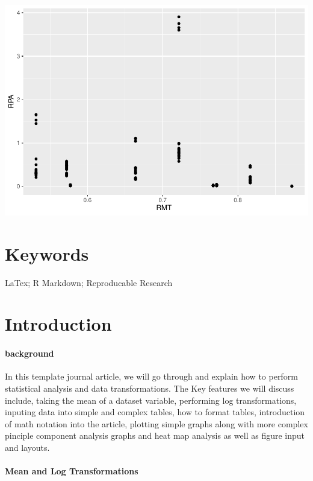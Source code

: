 \documentclass[]{elsarticle} %
\makeatletter
\def\maxwidth{\ifdim\Gin@nat@width>\linewidth\linewidth
\else\Gin@nat@width\fi}
\let\Oldincludegraphics\includegraphics
\renewcommand{\includegraphics}[1]{\Oldincludegraphics[width=\maxwidth]{#1}}
\makeatother
\begin{document}
\includegraphics{FinalDeliverableArticle_files/figure-latex/unnamed-chunk-1-1.pdf}

\hypertarget{keywords}{%
\section{Keywords}\label{keywords}}

LaTex; R Markdown; Reproducable Research

\hypertarget{introduction}{%
\section{Introduction}\label{introduction}}

\hypertarget{background}{%
\paragraph{background}\label{background}}

In this template journal article, we will go through and explain how to
perform statistical analysis and data transformations. The Key features
we will discuss include, taking the mean of a dataset variable,
performing log transformations, inputing data into simple and complex
tables, how to format tables, introduction of math notation into the
article, plotting simple graphs along with more complex pinciple
component analysis graphs and heat map analysis as well as figure input
and layouts.

\hypertarget{mean-and-log-transformations}{%
\paragraph{Mean and Log
Transformations}\label{mean-and-log-transformations}}
\end{document}
